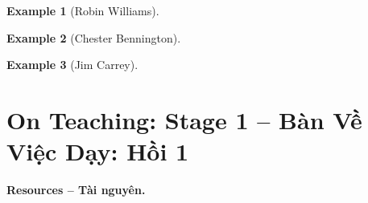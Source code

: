 \documentclass[12pt,oneside]{book}
\newtheorem{example}{Example}
\begin{document}
\begin{example}[{\sc Robin Williams}]
	
\end{example}

\begin{example}[{\sc Chester Bennington}]
	
\end{example}

\begin{example}[{\sc Jim Carrey}]
	
\end{example}


\chapter{On Teaching: Stage 1 -- Bàn Về Việc Dạy: Hồi 1}
\label{sect: teaching}
\minitoc
\noindent\textbf{\textsf{Resources -- Tài nguyên.}}
\end{document}
